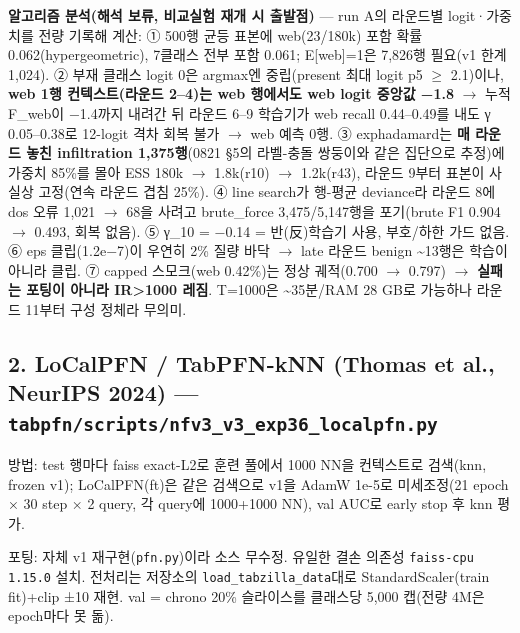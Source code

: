 \par\noindent \textbullet\enspace \textbf{알고리즘 분석(해석 보류, 비교실험 재개 시 출발점)} — run A의 라운드별 logit·가중치를 전량 기록해 계산: ① 500행 균등 표본에 web(23/\allowbreak{}180k) 포함 확률 0.062(hypergeometric), 7클래스 전부 포함 0.061; E[web]=\allowbreak{}1은 7,826행 필요(v1 한계 1,024). ② 부재 클래스 logit 0은 argmax엔 중립(present 최대 logit p5 \ensuremath{\geq} 2.1)이나, \textbf{web 1행 컨텍스트(라운드 2–4)는 web 행에서도 web logit 중앙값 −1.8}  \ensuremath{\rightarrow}  누적 F\_\allowbreak{}web이 −1.4까지 내려간 뒤 라운드 6–9 학습기가 web recall 0.44–0.49를 내도 γ 0.05–0.38로 12-logit 격차 회복 불가  \ensuremath{\rightarrow}  web 예측 0행. ③ exphadamard는 \textbf{매 라운드 놓친 infiltration 1,375행}(0821 §5의 라벨-충돌 쌍둥이와 같은 집단으로 추정)에 가중치 85\%를 몰아 ESS 180k \ensuremath{\rightarrow} 1.8k(r10) \ensuremath{\rightarrow} 1.2k(r43), 라운드 9부터 표본이 사실상 고정(연속 라운드 겹침 25\%). ④ line search가 행-평균 deviance라 라운드 8에 dos 오류 1,021 \ensuremath{\rightarrow} 68을 사려고 brute\_\allowbreak{}force 3,475/\allowbreak{}5,147행을 포기(brute F1 0.904 \ensuremath{\rightarrow} 0.493, 회복 없음). ⑤ γ\_\allowbreak{}10 =\allowbreak{} −0.14 =\allowbreak{} 반(反)학습기 사용, 부호/\allowbreak{}하한 가드 없음. ⑥ eps 클립(1.2e−7)이 우연히 2\% 질량 바닥  \ensuremath{\rightarrow}  late 라운드 benign \textasciitilde{}13행은 학습이 아니라 클립. ⑦ capped 스모크(web 0.42\%)는 정상 궤적(0.700 \ensuremath{\rightarrow} 0.797)  \ensuremath{\rightarrow}  \textbf{실패는 포팅이 아니라 IR>1000 레짐}. T=\allowbreak{}1000은 \textasciitilde{}35분/\allowbreak{}RAM 28 GB로 가능하나 라운드 11부터 구성 정체라 무의미.


\subsection{2. LoCalPFN /\allowbreak{} TabPFN-kNN (Thomas et al., NeurIPS 2024) — \texttt{tabpfn/\allowbreak{}\allowbreak{}s\allowbreak{}cripts/\allowbreak{}\allowbreak{}n\allowbreak{}fv3\_\allowbreak{}\allowbreak{}v3\_\allowbreak{}\allowbreak{}e\allowbreak{}xp36\_\allowbreak{}\allowbreak{}loc\allowbreak{}alpfn.\allowbreak{}py\allowbreak{}}}
방법: test 행마다 faiss exact-L2로 훈련 풀에서 1000 NN을 컨텍스트로 검색(knn, frozen v1); LoCalPFN(ft)은 같은 검색으로 v1을 AdamW 1e-5로 미세조정(21 epoch × 30 step × 2 query, 각 query에 1000+\allowbreak{}1000 NN), val AUC로 early stop 후 knn 평가.

\par\noindent \textbullet\enspace 포팅: 자체 v1 재구현(\texttt{pfn.\allowbreak{}py})이라 소스 무수정. 유일한 결손 의존성 \texttt{faiss-\allowbreak{}cp\allowbreak{}u 1.\allowbreak{}15.\allowbreak{}0\allowbreak{}} 설치. 전처리는 저장소의 \texttt{load\_\allowbreak{}\allowbreak{}tab\allowbreak{}zilla\_\allowbreak{}\allowbreak{}da\allowbreak{}ta}대로 StandardScaler(train fit)+\allowbreak{}clip ±10 재현. val =\allowbreak{} chrono 20\% 슬라이스를 클래스당 5,000 캡(전량 4M은 epoch마다 못 돎).



